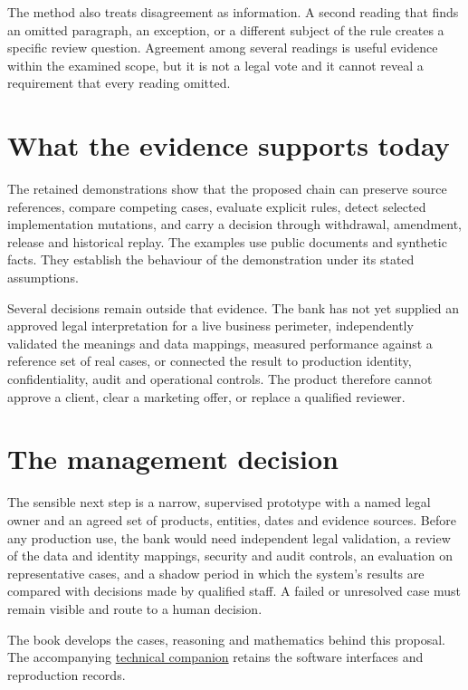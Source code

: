 \documentclass[12pt,a4paper,oneside,openany]{book}
\begin{document}
The method also treats disagreement as information. A second reading that finds
an omitted paragraph, an exception, or a different subject of the rule creates a
specific review question. Agreement among several readings is useful evidence
within the examined scope, but it is not a legal vote and it cannot reveal a
requirement that every reading omitted.

\section*{What the evidence supports today}

The retained demonstrations show that the proposed chain can preserve source
references, compare competing cases, evaluate explicit rules, detect selected
implementation mutations, and carry a decision through withdrawal, amendment,
release and historical replay. The examples use public documents and synthetic
facts. They establish the behaviour of the demonstration under its stated
assumptions.

Several decisions remain outside that evidence. The bank has not yet supplied
an approved legal interpretation for a live business perimeter, independently
validated the meanings and data mappings, measured performance against a
reference set of real cases, or connected the result to production identity,
confidentiality, audit and operational controls. The product therefore cannot
approve a client, clear a marketing offer, or replace a qualified reviewer.

\section*{The management decision}

The sensible next step is a narrow, supervised prototype with a named legal
owner and an agreed set of products, entities, dates and evidence sources. Before
any production use, the bank would need independent legal validation, a review
of the data and identity mappings, security and audit controls, an evaluation on
representative cases, and a shadow period in which the system's results are
compared with decisions made by qualified staff. A failed or unresolved case
must remain visible and route to a human decision.

The book develops the cases, reasoning and mathematics behind this proposal.
The accompanying \href{technical-companion.pdf}{technical companion} retains the
software interfaces and reproduction records.
\tableofcontents
\mainmatter










\backmatter
\begingroup
\raggedright


\endgroup
\end{document}
